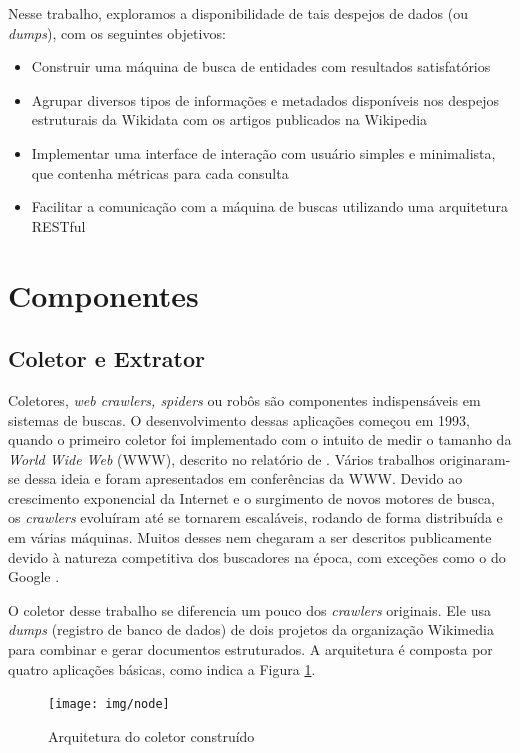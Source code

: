 \documentclass[12pt]{article}
\begin{document}
Nesse trabalho, exploramos a disponibilidade de tais despejos de dados (ou \emph{dumps}), com os seguintes objetivos:

\begin{itemize}
	\item Construir uma máquina de busca de entidades com resultados satisfatórios
	\item Agrupar diversos tipos de informações e metadados disponíveis nos despejos estruturais da Wikidata com os artigos publicados na Wikipedia
	\item Implementar uma interface de interação com usuário simples e minimalista, que contenha métricas para cada consulta
	\item Facilitar a comunicação com a máquina de buscas utilizando uma arquitetura RESTful
\end{itemize}


\section{Componentes}


\subsection{Coletor e Extrator}

Coletores, \emph{web crawlers, spiders} ou robôs são componentes indispensáveis em sistemas de buscas. O desenvolvimento dessas aplicações começou em 1993, quando o primeiro coletor foi implementado com o intuito de medir o tamanho da \emph{World Wide Web} (WWW), descrito no relatório de \cite{mgray}. Vários trabalhos originaram-se dessa ideia e foram apresentados em conferências da WWW. Devido ao crescimento exponencial da Internet e o surgimento de novos motores de busca, os \emph{crawlers} evoluíram até se tornarem escaláveis, rodando de forma distribuída e em várias máquinas. Muitos desses nem chegaram a ser descritos publicamente devido à natureza competitiva dos buscadores na época, com exceções como o do Google \cite{ilprints361}.


O coletor desse trabalho se diferencia um pouco dos \emph{crawlers} originais. Ele usa \emph{dumps} (registro de banco de dados) de dois projetos da organização Wikimedia para combinar e gerar documentos estruturados. A arquitetura é composta por quatro aplicações básicas, como indica a Figura \ref{crawler_arch}.

\begin{figure}
    \centering
    \texttt{[image: img/node]}
    \caption{Arquitetura do coletor construído}
    \label{crawler_arch}
\end{figure}
\end{document}
